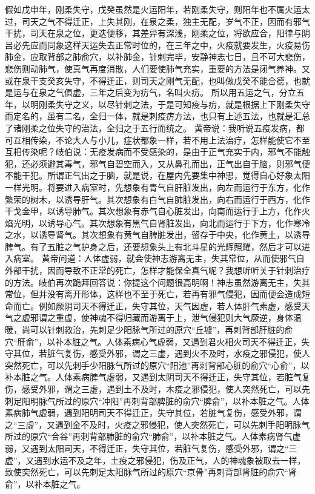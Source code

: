\documentclass[a4paper,12pt,UTF8,twoside]{ctexbook}
\begin{document}
假如戊申年，刚柔失守，戊癸虽然是火运阳年，若刚柔失守，则阳年也不属火运太过，司天之气不得迁正，上失其刚，在泉之柔，独主无配，岁气不正，因而有邪气干扰，司天在泉之位，更迭便移，其差异有深浅，刚柔之位，将欲应合，阳律与阴吕必先应而同象这样天运失去正常时位的，在三年之中，火疫就要发生，火疫易伤肺金，应取背部之肺俞穴，以补肺金，针刺完毕，安静神志七日，且不可大悲伤，悲伤则动肺气，使真气再度消散，人们要使肺气充实，重要的方法是闭气养神。又或在泉干支癸亥失守，不得迁正，则司天之刚气无配，也叫做戊癸不能合德，也就是运与在泉之气俱虚，三年之后变为疠气，名叫火疠。
所以用五运之气，分立五年，以明刚柔失守之义，以尽针刺之法，于是可知疫与疠，就是根据上下刚柔失守而定名的，虽有二名，全归一体，就是刺疫疠方法，也只有上述五法，也就是汇总了诸刚柔之位失守的治法，全归之于五行而统之。
黄帝说：我听说五疫发病，都可互相传染，不论大人与小儿，症状都象一样，若不用上法治疗，怎样能使它不至互相传染呢？岐伯说：无疫发病而不受感染的，是由于正气充实于内，邪气不能触犯，还必须避其毒气，邪气自碧空而入，又从鼻孔而出，正气出自于脑，则邪气便不能干犯。所谓正气出之于脑，就是说，在屋内先要集中神思，觉得自心好象太阳一样光明。将要进入病室时，先想象有青气自肝脏发出，向左而运行于东方，化作繁荣的树木，以诱导肝气。其次想象有白气自肺脏发出，向右而运行于西方，化作干戈金甲，以诱导肺气。其次想象有赤气自心脏发出，向南而运行于上方，化作火焰光明，以诱导心气。其次想象有黑气自肾脏发出，向北而运行于下方，化作寒冷之水，以诱导肾气。其次想象有黄气自脾脏发出，留存于中央，化作黄土，以诱导脾气。有了五脏之气护身之后，还要想象头上有北斗星的光辉照耀，然后才可以进入病室。
黄帝问道：人体虚弱，就会使神志游离无主，失其常位，从而使邪气自外部干扰，因而导致不正常的死亡，怎样才能保全真气呢？我想听听关于针刺治疗的方法。岐伯再次跪拜回答说：你提这个问题很高明啊！神志虽然游离无主，失其常位，但并没有离开形体，这样也不至于死亡，若再有邪气侵犯，因而便会造成短命而亡。例如厥阴司天不得迁正，失守其位，天气因虚，若人体肝气素虚，感受天气之虚邪谓之重虚，使神魂不得归藏而游离于上，泄气侵犯则大气厥逆，身体温暖，尚可以针刺救治，先刺足少阳脉气所过的原穴“丘墟”，再刺背部肝脏的俞穴“肝俞”，以补本脏之气。人体素病心气虚弱，又遇到君火相火司天不得迁正，失守其位，若脏气复伤，感受外邪，谓之三虚，遇到火不及时，水疫之邪侵犯，使人突然死亡，可以先刺手少阳脉气所过的原穴“阳池”再刺背部心脏的俞穴“心俞”，以补本脏之气。人体素病脾气虚弱，又遇到太阴司天不得迁正，失守其位，若脏气复伤，感受外邪，谓之三虚，遇到土不及时，木疫之邪侵犯，使人突然死亡，可以先刺足阳明脉气所过的原穴“冲阳”再刺背部脾脏的俞穴“脾俞”，以补本脏之气。人体素病肺气虚弱，遇到阳明司天不得迁正，失守其位，若脏气复伤，感受外邪，谓之“三虚”，又遇到金不及时，火疫之邪侵犯，使人突然死亡，可以先刺手阳明脉气所过的原穴“合谷”再刺背部肺脏的俞穴“肺俞”，以补本脏之气。人体素病肾气虚弱，又遇到太阳司天，不得迁正，失守其位，若脏气复伤，感受外邪，谓之“三虚”，又遇到水运不及之年，土疫之邪侵犯，伤及正气，人的神魂象被取去一样，致使突然死亡，可以先刺足太阳脉气所过的原穴“京骨”再刺背部肾脏的俞穴“肾俞”，以补本脏之气。
\end{document}
